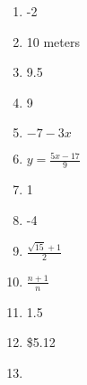 \documentclass[../uilmath.tex]{subfiles}
\begin{document}
\begin{enumerate}[label=\bfseries\arabic*.]
    \item %
    -2

    \item %
    10 meters 

    \item %
    9.5 

    \item %
    9

    \item %
    $-7-3x$

    \item %
    $y=\frac{5x-17}{9}$

    \item %
    1 

    \item %
    -4 

    \item %
    $\frac{\sqrt{15}+1}{2}$

    \item %
    $\frac{n+1}{n}$

    \item %
    1.5

    \item %
    \$5.12 

    \item %
    
\end{enumerate}
\end{document}
